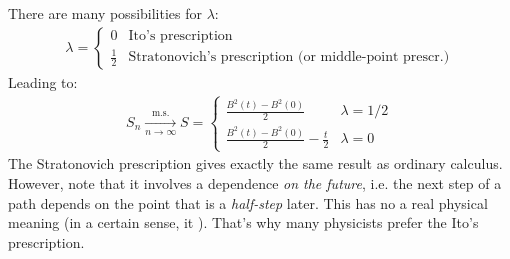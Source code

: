 \documentclass[../template.tex]{subfiles}
\begin{document}
\begin{example}[a]
    There are many possibilities for $\lambda$:
    \begin{align*}
        \lambda = \begin{cases}
            0 & \text{Ito's prescription}\\
            \frac{1}{2} & \text{Stratonovich's prescription (or middle-point prescr.)} 
        \end{cases}
    \end{align*} 
    Leading to:
    \begin{align*}
        S_n  \xrightarrow[n \to \infty]{\mathrm{m.s.}} S = \begin{cases}
            \frac{B^2(t) - B^2(0)}{2} & \lambda=1/2\\
            \frac{B^2(t) - B^2(0)}{2} -\frac{t}{2} & \lambda = 0  
        \end{cases}  
    \end{align*} 
    The Stratonovich prescription gives exactly the same result as ordinary calculus. However, note that it involves a dependence \textit{on the future}, i.e. the next step of a path depends on the point that is a \textit{half-step} later. This has no a real physical meaning (in a certain sense, it ). That's why many physicists prefer the Ito's prescription.\\


\end{example}
\end{document}

